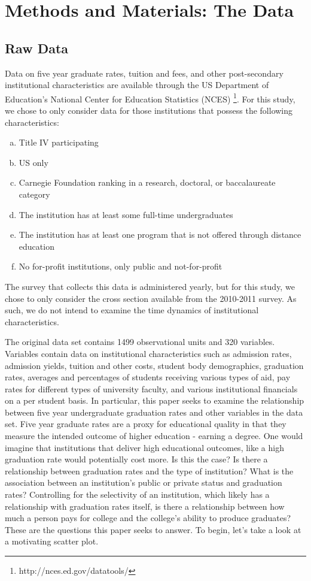 \documentclass{article}
\begin{document}
\section{Methods and Materials: The Data}

\subsection{Raw Data}
Data on five year graduate rates, tuition and fees, and other post-secondary institutional characteristics are available through the US Department of Education's National Center for Education Statistics (NCES) \footnote{http://nces.ed.gov/datatools/}. For this study, we chose to only consider data for those institutions that possess the following characteristics:

\begin{enumerate}[a)]
\item{} Title IV participating
\item{} US only
\item{} Carnegie Foundation ranking in a research, doctoral, or baccalaureate category
\item{} The institution has at least some full-time undergraduates
\item{} The institution has at least one program that is not offered through distance education
\item{} No for-profit institutions, only public and not-for-profit
\end{enumerate}

The survey that collects this data is administered yearly, but for this study, we chose to only consider the cross section available from the 2010-2011 survey. As such, we do not intend to examine the time dynamics of institutional characteristics.

The original data set contains 1499 observational units and 320 variables. Variables contain data on institutional characteristics such as admission rates, admission yields, tuition and other costs, student body demographics, graduation rates, averages and percentages of students receiving various types of aid, pay rates for different types of university faculty, and various institutional financials on a per student basis. In particular, this paper seeks to examine the relationship between five year undergraduate graduation rates and other variables in the data set. Five year graduate rates are a proxy for educational quality in that they measure the intended outcome of higher education - earning a degree. One would imagine that institutions that deliver high educational outcomes, like a high graduation rate would potentially cost more. Is this the case? Is there a relationship between graduation rates and the type of institution? What is the association between an institution's public or private status and graduation rates? Controlling for the selectivity of an institution, which likely has a relationship with graduation rates itself, is there a relationship between how much a person pays for college and the college's ability to produce graduates? These are the questions this paper seeks to answer. To begin, let's take a look at a motivating scatter plot. 
\end{document}

